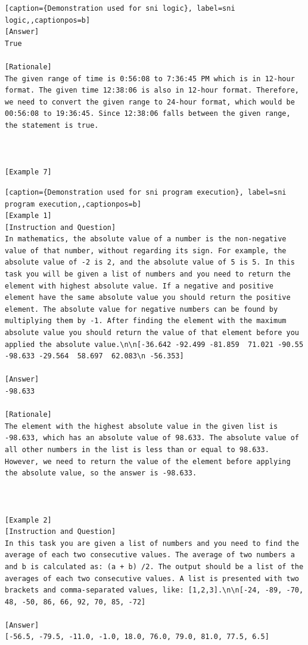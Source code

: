 \begin{lstlisting}[caption={Demonstration used for sni logic}, label=sni logic,,captionpos=b]
[Answer]
True

[Rationale]
The given range of time is 0:56:08 to 7:36:45 PM which is in 12-hour format. The given time 12:38:06 is also in 12-hour format. Therefore, we need to convert the given range to 24-hour format, which would be 00:56:08 to 19:36:45. Since 12:38:06 falls between the given range, the statement is true.



[Example 7]
    \end{lstlisting}
    




\begin{lstlisting}[caption={Demonstration used for sni program execution}, label=sni program execution,,captionpos=b]
[Example 1]
[Instruction and Question]
In mathematics, the absolute value of a number is the non-negative value of that number, without regarding its sign. For example, the absolute value of -2 is 2, and the absolute value of 5 is 5. In this task you will be given a list of numbers and you need to return the element with highest absolute value. If a negative and positive element have the same absolute value you should return the positive element. The absolute value for negative numbers can be found by multiplying them by -1. After finding the element with the maximum absolute value you should return the value of that element before you applied the absolute value.\n\n[-36.642 -92.499 -81.859  71.021 -90.55  -98.633 -29.564  58.697  62.083\n -56.353]

[Answer]
-98.633

[Rationale]
The element with the highest absolute value in the given list is -98.633, which has an absolute value of 98.633. The absolute value of all other numbers in the list is less than or equal to 98.633. However, we need to return the value of the element before applying the absolute value, so the answer is -98.633.



[Example 2]
[Instruction and Question]
In this task you are given a list of numbers and you need to find the average of each two consecutive values. The average of two numbers a and b is calculated as: (a + b) /2. The output should be a list of the averages of each two consecutive values. A list is presented with two brackets and comma-separated values, like: [1,2,3].\n\n[-24, -89, -70, 48, -50, 86, 66, 92, 70, 85, -72]

[Answer]
[-56.5, -79.5, -11.0, -1.0, 18.0, 76.0, 79.0, 81.0, 77.5, 6.5]


\end{lstlisting}
